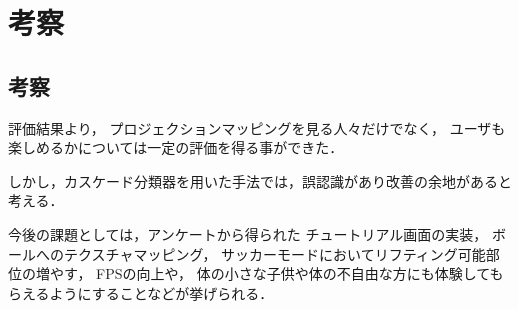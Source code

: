 \chapter{考察}
\thispagestyle{fancy}

\section{考察}
評価結果より，
プロジェクションマッピングを見る人々だけでなく，
ユーザも楽しめるかについては一定の評価を得る事ができた．

しかし，カスケード分類器を用いた手法では，誤認識があり改善の余地があると考える．





今後の課題としては，アンケートから得られた
チュートリアル画面の実装，
ボールへのテクスチャマッピング，
サッカーモードにおいてリフティング可能部位の増やす，
FPSの向上や，
体の小さな子供や体の不自由な方にも体験してもらえるようにすることなどが挙げられる．